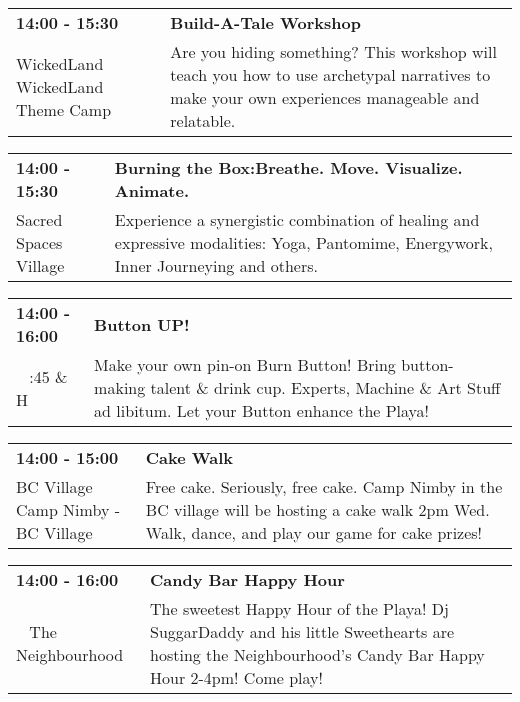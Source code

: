\begin{tabular}{ p{1in} p{2.2in} }
    \textbf{14:00 - 15:30} & \textbf{Build-A-Tale Workshop} \\
    WickedLand \newline WickedLand Theme Camp & Are you hiding something? This workshop will teach you how to use archetypal narratives to make your own experiences manageable and relatable. \\
    \hline 
\end{tabular}
    
\begin{tabular}{ p{1in} p{2.2in} }
    \textbf{14:00 - 15:30} & \textbf{Burning the Box:Breathe. Move. Visualize. Animate.} \\
    Sacred Spaces Village \newline  & Experience a synergistic combination of healing and expressive modalities: Yoga, Pantomime, Energywork, Inner Journeying and others. \\
    \hline 
\end{tabular}
    
\begin{tabular}{ p{1in} p{2.2in} }
    \textbf{14:00 - 16:00} & \textbf{Button UP!} \\
    ~ \newline 6:45 \& H & Make your own pin-on Burn Button! Bring button-making talent \& drink cup. Experts, Machine \& Art Stuff ad libitum. Let your Button enhance the Playa! \\
    \hline 
\end{tabular}
    
\begin{tabular}{ p{1in} p{2.2in} }
    \textbf{14:00 - 15:00} & \textbf{Cake Walk } \\
    BC Village \newline Camp Nimby - BC Village  & Free cake. Seriously, free cake. Camp Nimby in the BC village will be hosting a cake walk 2pm Wed. Walk, dance, and play our game for cake prizes! \\
    \hline 
\end{tabular}
    
\begin{tabular}{ p{1in} p{2.2in} }
    \textbf{14:00 - 16:00} & \textbf{Candy Bar Happy Hour} \\
    ~ \newline The Neighbourhood & The sweetest Happy Hour of the Playa! Dj SuggarDaddy and his little Sweethearts are hosting the Neighbourhood's Candy Bar Happy Hour 2-4pm! Come play! \\
    \hline 
\end{tabular}
    
